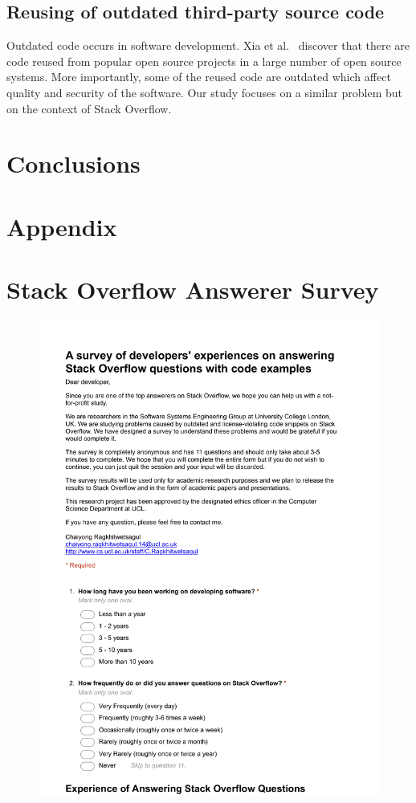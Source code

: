 \documentclass{svjour3}                     %
\begin{document}
\subsection{Reusing of outdated third-party source code} 
Outdated code occurs in software development. Xia et al.~\cite{Xia2014} discover
that there are code reused from popular open source projects in a large number
of open source systems. More importantly, some of the reused code are outdated
which affect quality and security of the software. Our study focuses on a
similar problem but on the context of Stack Overflow.

\section{Conclusions}

%
%

 

\clearpage
\section{Appendix}
\appendix
\section{Stack Overflow Answerer Survey}
\begin{figure}[H]
	\centering
	\includegraphics[width=0.8\linewidth]{answerer-1}
	\label{fig:answerer-1}
\end{figure}
\end{document}
